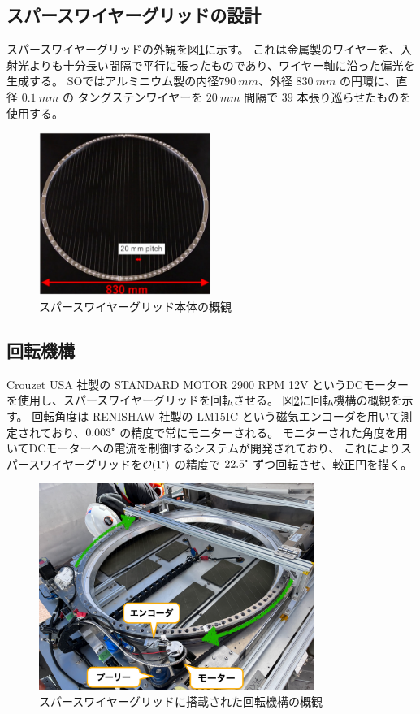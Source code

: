 \documentclass[../../main.tex]{subfiles}
\begin{document}
\subsection{スパースワイヤーグリッドの設計}
スパースワイヤーグリッドの外観を図\ref{fig:wiregrid_appearance}に示す。
これは金属製のワイヤーを、入射光よりも十分長い間隔で平行に張ったものであり、ワイヤー軸に沿った偏光を生成する。
SOではアルミニウム製の内径$\SI{790}{mm}$、外径 $\SI{830}{mm}$ の円環に、直径 $\SI{0.1}{mm}$ の
タングステンワイヤーを $\SI{20}{mm}$ 間隔で $39$ 本張り巡らせたものを使用する\cite{swg:murata}。
\begin{figure}[H]
    \centering
    \includegraphics[width=0.5\textwidth]{wiregrid/wiregrid_appearance.pdf}
    \caption[スパースワイヤーグリッド本体の外観]{スパースワイヤーグリッド本体の概観}
    \label{fig:wiregrid_appearance}
\end{figure}
\subsection{回転機構}
Crouzet USA 社製の STANDARD MOTOR 2900 RPM 12V というDCモーターを使用し、スパースワイヤーグリッドを回転させる。
図\ref{fig:rotation_parts}に回転機構の概観を示す。
回転角度は RENISHAW 社製の LM15IC という磁気エンコーダを用いて測定されており、$0.003\tcdegree$ の精度で常にモニターされる。
モニターされた角度を用いてDCモーターへの電流を制御するシステムが開発されており、
これによりスパースワイヤーグリッドを$\order{1\tcdegree}$ の精度で $22.5\tcdegree$ ずつ回転させ、較正円を描く\cite{swg:nakata}。
\begin{figure}[H]
    \centering
    \includegraphics[width=0.8\textwidth]{wiregrid/rotation_parts.pdf}
    \caption{スパースワイヤーグリッドに搭載された回転機構の概観}
    \label{fig:rotation_parts}
\end{figure}
\end{document}
